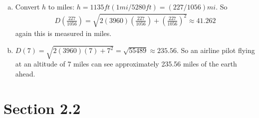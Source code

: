 \documentclass[fleqn]{article}
\begin{document}
\begin{enumerate}
\begin{enumerate}[(a)]
\item
Convert $h$ to miles: $h = 1135 ft (1 mi / 5280 ft) = (227/1056) mi$. So
\begin{align*}
D\left(\frac{227}{1056}\right) = \sqrt{ 2(3960)\left(\frac{227}{1056}\right) + \left( \frac{227}{1056}\right)^2 }
\approx 41.262
\end{align*}
again this is measured in miles.

\item
$D(7) = \sqrt{2(3960)(7) + 7^2} = \sqrt{55489} \approx 235.56$. So an airline pilot flying at an altitude of 7 miles can see approximately 235.56 miles of the earth ahead.

\end{enumerate}

\end{enumerate}

\section{Section 2.2}
\end{document}
